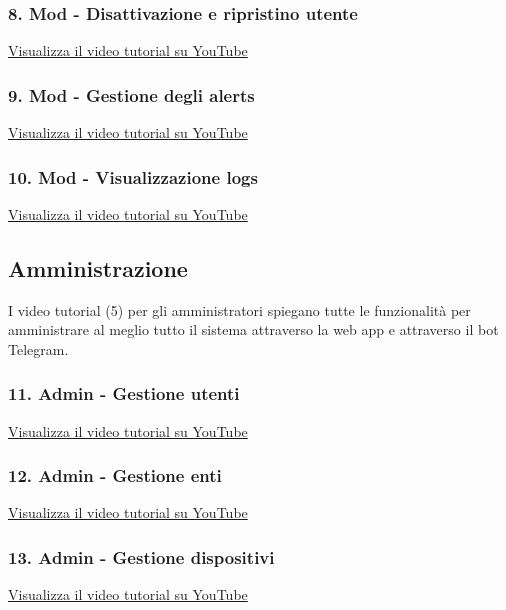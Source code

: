 \subsubsection{8. Mod - Disattivazione e ripristino utente}
\href{https://www.youtube.com/watch?v=PjySMOLCtMA&list=PLPKYjnuIh1FA3b3jn_bwY_ztYzaFn2mIT&index=11}
{Visualizza il video tutorial su YouTube}

\subsubsection{9. Mod - Gestione degli alerts}
\href{https://www.youtube.com/watch?v=PjySMOLCtMA&list=PLPKYjnuIh1FA3b3jn_bwY_ztYzaFn2mIT&index=12}
{Visualizza il video tutorial su YouTube}

\subsubsection{10. Mod - Visualizzazione logs}
\href{https://www.youtube.com/watch?v=PjySMOLCtMA&list=PLPKYjnuIh1FA3b3jn_bwY_ztYzaFn2mIT&index=13}
{Visualizza il video tutorial su YouTube}

\subsection{Amministrazione}

I video tutorial (5) per gli amministratori spiegano tutte le funzionalità per amministrare al meglio tutto il sistema attraverso la web app e attraverso il bot Telegram.

\subsubsection{11. Admin - Gestione utenti}
\href{https://www.youtube.com/watch?v=PjySMOLCtMA&list=PLPKYjnuIh1FA3b3jn_bwY_ztYzaFn2mIT&index=14}
{Visualizza il video tutorial su YouTube}

\subsubsection{12. Admin - Gestione enti}
\href{https://www.youtube.com/watch?v=PjySMOLCtMA&list=PLPKYjnuIh1FA3b3jn_bwY_ztYzaFn2mIT&index=15}
{Visualizza il video tutorial su YouTube}

\subsubsection{13. Admin - Gestione dispositivi}
\href{https://www.youtube.com/watch?v=PjySMOLCtMA&list=PLPKYjnuIh1FA3b3jn_bwY_ztYzaFn2mIT&index=16}
{Visualizza il video tutorial su YouTube}

